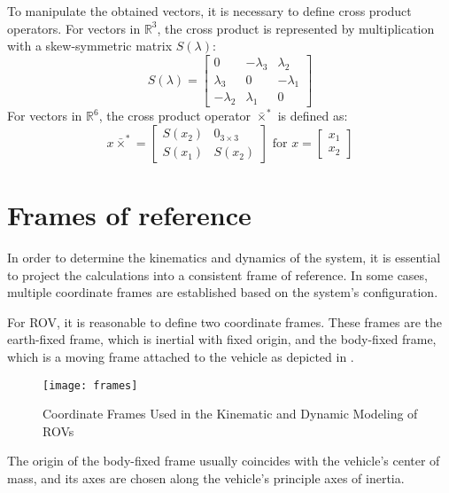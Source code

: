     To manipulate the obtained vectors, it is necessary to define cross product 
    operators. For vectors in \( \mathbb{R}^3 \), the cross product is represented 
    by multiplication with a skew-symmetric matrix \( S(\lambda) \):
    \begin{equation}
        S(\lambda) = \begin{bmatrix}
            0 & -\lambda_3 & \lambda_2 \\
            \lambda_3 & 0 & -\lambda_1 \\
            -\lambda_2 & \lambda_1 & 0
        \end{bmatrix}
    \end{equation} 
    For vectors in \( \mathbb{R}^6 \), the cross product operator 
    \( \bar{\times}^* \) is defined as:
    \begin{equation}
        x \bar{\times}^* = \begin{bmatrix}
            S(x_2) & 0_{3 \times 3} \\
            S(x_1) & S(x_2)
        \end{bmatrix}
        \text{ for } x = \begin{bmatrix}
            x_1 \\
            x_2 
        \end{bmatrix}
    \end{equation}

\section{Frames of reference}

    In order to determine the kinematics and dynamics of the system, it is essential 
    to project the calculations into a consistent frame of reference. 
    In some cases, multiple coordinate frames are established based on the system's configuration.
    
    For ROV, it is reasonable to define two coordinate frames. 
    These frames are the earth-fixed frame, which is inertial with fixed origin, and the body-fixed frame, 
    which is a moving frame attached to the vehicle as depicted in . 
    \begin{figure}[H]
        \centering\texttt{[image: frames]}
        \caption{Coordinate Frames Used in the Kinematic and Dynamic Modeling of ROVs}
        \label{image:frames}
    \end{figure}

    The origin of the body-fixed frame usually coincides with the vehicle's center of mass,
     and its axes are chosen along the vehicle's principle axes of inertia.

